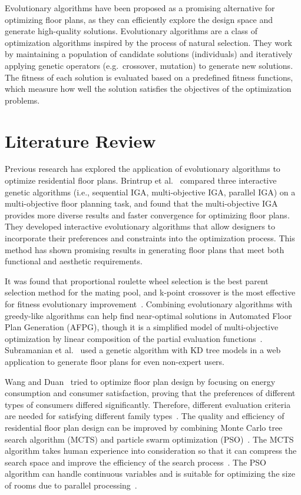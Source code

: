 \documentclass[]{article}
\begin{document}
Evolutionary algorithms have been proposed as a promising alternative for optimizing floor plans, as they can efficiently explore the design space and generate high-quality solutions. Evolutionary algorithms are a class of optimization algorithms inspired by the process of natural selection. They work by maintaining a population of candidate solutions (individuals) and iteratively applying genetic operators (e.g.\ crossover, mutation) to generate new solutions. The fitness of each solution is evaluated based on a predefined fitness functions, which measure how well the solution satisfies the objectives of the optimization problems.

\section{Literature Review}
Previous research has explored the application of evolutionary algorithms to optimize residential floor plans. Brintrup et al.~\cite{10.1007/11732242_56} compared three interactive genetic algorithms (i.e., sequential IGA, multi-objective IGA, parallel IGA) on a multi-objective floor planning task, and found that the multi-objective IGA provides more diverse results and faster convergence for optimizing floor plans. They developed interactive evolutionary algorithms that allow designers to incorporate their preferences and constraints into the optimization process. This method has shown promising results in generating floor plans that meet both functional and aesthetic requirements.

It was found that proportional roulette wheel selection is the best parent selection method for the mating pool, and k-point crossover is the most effective for fitness evolutionary improvement~\cite{7844659}.
Combining evolutionary algorithms with greedy-like algorithms can help find near-optimal solutions in Automated Floor Plan Generation (AFPG), though it is a simplified model of multi-objective optimization by linear composition of the partial evaluation functions~\cite{doi:10.1177/1478077119832982}. Subramanian et al.~\cite{9675541} used a genetic algorithm with KD tree models in a web application to generate floor plans for even non-expert users.

Wang and Duan~\cite{WANG2023100238} tried to optimize floor plan design by focusing on energy consumption and consumer satisfaction, proving that the preferences of different types of consumers differed significantly. Therefore, different evaluation criteria are needed for satisfying different family types~\cite{WANG2023100238}. The quality and efficiency of residential floor plan design can be improved by combining Monte Carlo tree search algorithm (MCTS) and particle swarm optimization (PSO)~\cite{YAN2024110546}. The MCTS algorithm takes human experience into consideration so that it can compress the search space and improve the efficiency of the search process~\cite{YAN2024110546}. The PSO algorithm can handle continuous variables and is suitable for optimizing the size of rooms due to parallel processing~\cite{YAN2024110546}.
\end{document}
